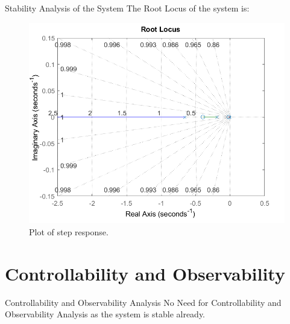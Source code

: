 \documentclass[10pt,compress,mathserif]{beamer}
\begin{document}
\begin{frame}{Stability Analysis of the System}
	The Root Locus of the system is:
	\begin{figure}[h!]
		\centering
		\includegraphics[scale=0.65]{images/rootLocus.png}
		\caption{Plot of step response.}
	\end{figure}
\end{frame}



\section{Controllability and Observability}
\begin{frame}{Controllability and Observability Analysis}
No Need for Controllability and Observability Analysis as the system is stable already.
\end{frame}


\end{document}
